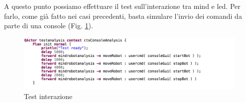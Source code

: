 \documentclass{llncs}
\begin{document}
A questo punto possiamo effettuare il test sull'interazione tra mind e led. Per farlo, come gi\`a fatto nei casi precedenti, basta simulare l'invio dei comandi da parte di una console (Fig. \hyperref[fig:testReq4]{\ref{fig:testReq4}}).\\
\begin{figure}
    \centering
    \includegraphics[width=1\textwidth]{Immagini/Requisito4/TestReq4.png}
    \caption{Test interazione}
    \label{fig:testReq4}
\end{figure}

\end{document}
